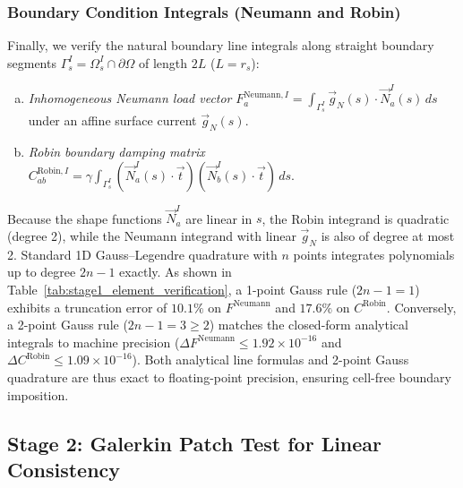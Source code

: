 \documentclass[preprint,12pt]{elsarticle}
\begin{document}
\subsubsection{Boundary Condition Integrals (Neumann and Robin)}
Finally, we verify the natural boundary line integrals along straight boundary segments $\Gamma_s^I = \Omega_s^I \cap \partial\Omega$ of length $2L$ ($L = r_s$):
\begin{enumerate}[(a)]
    \item \textit{Inhomogeneous Neumann load vector} $F_a^{\mathrm{Neumann}, I} = \int_{\Gamma_s^I} \vec{g}_N(s) \cdot \vec{N}_a^I(s) \, ds$ under an affine surface current $\vec{g}_N(s)$.
    \item \textit{Robin boundary damping matrix} $C_{ab}^{\mathrm{Robin}, I} = \gamma \int_{\Gamma_s^I} (\vec{N}_a^I(s) \cdot \vec{t})(\vec{N}_b^I(s) \cdot \vec{t}) \, ds$.
\end{enumerate}
Because the shape functions $\vec{N}_a^I$ are linear in $s$, the Robin integrand is quadratic (degree 2), while the Neumann integrand with linear $\vec{g}_N$ is also of degree at most 2. Standard 1D Gauss--Legendre quadrature with $n$ points integrates polynomials up to degree $2n - 1$ exactly. As shown in Table~\ref{tab:stage1_element_verification}, a 1-point Gauss rule ($2n-1 = 1$) exhibits a truncation error of $10.1\%$ on $F^{\mathrm{Neumann}}$ and $17.6\%$ on $C^{\mathrm{Robin}}$. Conversely, a 2-point Gauss rule ($2n-1 = 3 \ge 2$) matches the closed-form analytical integrals to machine precision ($\Delta F^{\mathrm{Neumann}} \le 1.92 \times 10^{-16}$ and $\Delta C^{\mathrm{Robin}} \le 1.09 \times 10^{-16}$). Both analytical line formulas and 2-point Gauss quadrature are thus exact to floating-point precision, ensuring cell-free boundary imposition.

\subsection{Stage 2: Galerkin Patch Test for Linear Consistency}
\label{subsec:stage2_patch_test}
\end{document}
